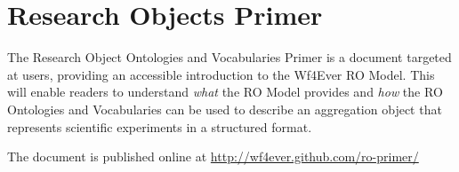 \section{Research Objects Primer}
\label{sec:primer}

The Research Object Ontologies and Vocabularies Primer is a document
targeted at users, providing an accessible introduction to the Wf4Ever
RO Model. This will enable readers to understand \emph{what} the RO Model
provides and \emph{how} the RO Ontologies and Vocabularies can be used to
describe an aggregation object that represents scientific experiments
in a structured format. 

The document is published online at \url{http://wf4ever.github.com/ro-primer/}

